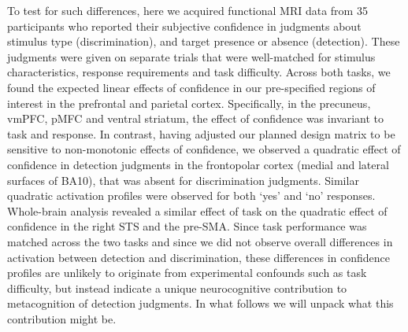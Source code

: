 \documentclass[12pt,twoside]{reedthesis}
\begin{document}
To test for such differences, here we acquired functional MRI data from 35 participants who reported their subjective confidence in judgments about stimulus type (discrimination), and target presence or absence (detection). These judgments were given on separate trials that were well-matched for stimulus characteristics, response requirements and task difficulty. Across both tasks, we found the expected linear effects of confidence in our pre-specified regions of interest in the prefrontal and parietal cortex. Specifically, in the precuneus, vmPFC, pMFC and ventral striatum, the effect of confidence was invariant to task and response. In contrast, having adjusted our planned design matrix to be sensitive to non-monotonic effects of confidence, we observed a quadratic effect of confidence in detection judgments in the frontopolar cortex (medial and lateral surfaces of BA10), that was absent for discrimination judgments. Similar quadratic activation profiles were observed for both `yes' and `no' responses. Whole-brain analysis revealed a similar effect of task on the quadratic effect of confidence in the right STS and the pre-SMA. Since task performance was matched across the two tasks and since we did not observe overall differences in activation between detection and discrimination, these differences in confidence profiles are unlikely to originate from experimental confounds such as task difficulty, but instead indicate a unique neurocognitive contribution to metacognition of detection judgments. In what follows we will unpack what this contribution might be.
\end{document}
